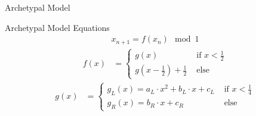 \begin{frame}{Archetypal Model}
	\begin{figure}
		\centering
	\end{figure}
\end{frame}

\begin{frame}{Archetypal Model Equations}
	\vspace{-1.0em}
	\begin{align*}
		x_{n+1} = f(x_n) \mod 1
	\end{align*}
	\begin{align*}
		f(x) & = \begin{cases}
			         g(x)                                        & \text{ if } x < \frac{1}{2} \\
			         g\left(x - \frac{1}{2}\right) + \frac{1}{2} & \text{ else}
		         \end{cases}
	\end{align*}
	\begin{align*}
		g(x) & = \begin{cases}
			         g_L(x) = a_L \cdot x^2 + b_L \cdot x + c_L & \text{ if } x < \frac{1}{4} \\
			         g_R(x) = b_R \cdot x + c_R                 & \text{ else}
		         \end{cases}
	\end{align*}
\end{frame}

